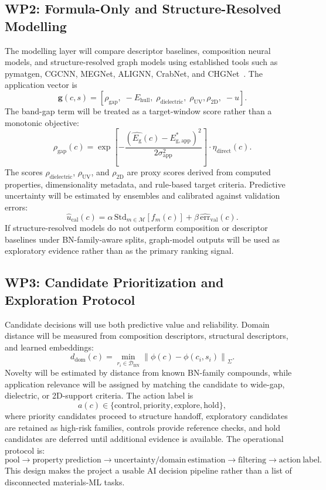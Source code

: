 \documentclass[10pt,a4paper]{article}
\newcommand{\eg}{E_{\mathrm{g}}}
\newcommand{\ehull}{E_{\mathrm{hull}}}
\newcommand{\unc}{u}
\newcommand{\domain}{d_{\mathrm{dom}}}
\newcommand{\gapscore}{\rho_{\mathrm{gap}}}
\begin{document}
\subsection{WP2: Formula-Only and Structure-Resolved Modelling}
The modelling layer will compare descriptor baselines, composition neural models, and structure-resolved graph models using established tools such as pymatgen, CGCNN, MEGNet, ALIGNN, CrabNet, and CHGNet~\cite{ong2013_pymatgen,xie2018_cgcnn,chen2019_megnet,choudhary2021_alignn,wang2021_crabnet,deng2023_chgnet}. The application vector is
\[
  \mathbf{g}(c,s)=
  [\gapscore,\;-\ehull,\;\rho_{\mathrm{dielectric}},\;\rho_{\mathrm{UV}},
  \rho_{\mathrm{2D}},\;-\unc].
\]
The band-gap term will be treated as a target-window score rather than a monotonic objective:
\[
  \gapscore(c)=
  \exp\!\left[-\frac{(\hat{\eg}(c)-E^*_{\mathrm{g,app}})^2}{2\sigma_{\mathrm{app}}^2}\right]
  \cdot\eta_{\mathrm{direct}}(c).
\]
The scores $\rho_{\mathrm{dielectric}}$, $\rho_{\mathrm{UV}}$, and $\rho_{\mathrm{2D}}$ are proxy scores derived from computed properties, dimensionality metadata, and rule-based target criteria. Predictive uncertainty will be estimated by ensembles and calibrated against validation errors:
\[
  \hat{\unc}_{\mathrm{cal}}(c)=
  \alpha\,\mathrm{Std}_{m\in\mathcal{M}}\!\left[f_m(c)\right]+
  \beta\,\widehat{\mathrm{err}}_{\mathrm{val}}(c).
\]
If structure-resolved models do not outperform composition or descriptor baselines under BN-family-aware splits, graph-model outputs will be used as exploratory evidence rather than as the primary ranking signal.

\subsection{WP3: Candidate Prioritization and Exploration Protocol}
Candidate decisions will use both predictive value and reliability. Domain distance will be measured from composition descriptors, structural descriptors, and learned embeddings:
\[
  \domain(c)=\min_{r_i\in\mathcal{D}_{\mathrm{BN}}}
  \left\|\phi(c)-\phi(c_i,s_i)\right\|_{\Sigma}.
\]
Novelty will be estimated by distance from known BN-family compounds, while application relevance will be assigned by matching the candidate to wide-gap, dielectric, or 2D-support criteria. The action label is
\[
  a(c)\in\{\mathrm{control},\mathrm{priority},\mathrm{explore},\mathrm{hold}\},
\]
where priority candidates proceed to structure handoff, exploratory candidates are retained as high-risk families, controls provide reference checks, and hold candidates are deferred until additional evidence is available. The operational protocol is:
\[
  \mathrm{pool}\rightarrow\mathrm{property\ prediction}\rightarrow
  \mathrm{uncertainty/domain\ estimation}\rightarrow
  \mathrm{filtering}\rightarrow\mathrm{action\ label}.
\]
This design makes the project a usable AI decision pipeline rather than a list of disconnected materials-ML tasks.
\end{document}
